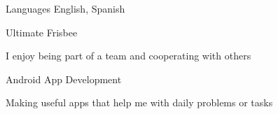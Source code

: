 \documentclass[11pt, a4paper]{awesome-cv}
\begin{document}
\begin{cvskills}
  \cvskill
    {Languages} %
    {English, Spanish} %

\end{cvskills}


\begin{cventries}
  \cventry
    {}
    {Ultimate Frisbee}
    {}
    {}
    {
      \begin{cvitems}
        \item {I enjoy being part of a team and cooperating with others}
      \end{cvitems}
    }

    \cventry
      {}
      {Android App Development}
      {}
      {}
      {
        \begin{cvitems}
          \item {Making useful apps that help me with daily problems or tasks}
        \end{cvitems}
      }

\end{cventries}
\end{document}
